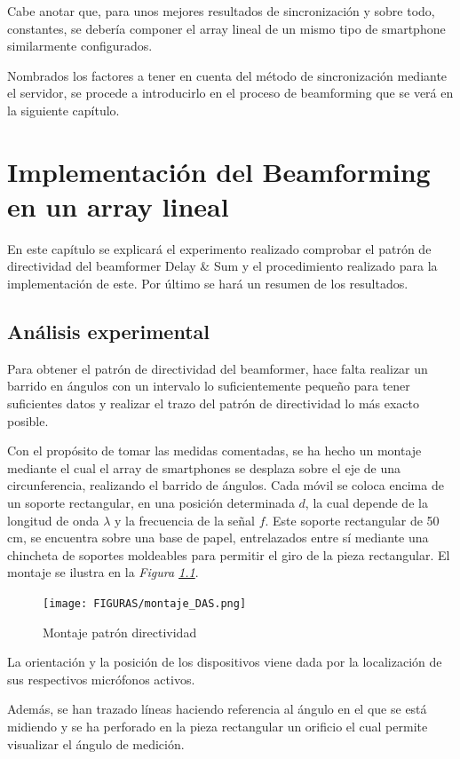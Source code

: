 \documentclass[a4paper,11pt]{book}
\begin{document}
Cabe anotar que, para unos mejores resultados de sincronización y sobre todo, constantes, se debería componer el array lineal de un mismo tipo de smartphone similarmente configurados.

Nombrados los factores a tener en cuenta del método de sincronización mediante el servidor, se procede a introducirlo en el proceso de beamforming que se verá en la siguiente capítulo.

\chapter{Implementación del Beamforming en un array lineal}
 En este capítulo se explicará el experimento realizado comprobar el patrón de directividad del beamformer Delay \& Sum y el procedimiento realizado para la implementación de este. Por último se hará un resumen de los resultados.
 
\section{Análisis experimental}
Para obtener el patrón de directividad del beamformer, hace falta realizar un barrido en ángulos con un intervalo lo suficientemente pequeño para tener suficientes datos y realizar el trazo del patrón de directividad lo más exacto posible.

Con el propósito de tomar las medidas comentadas, se ha hecho un montaje mediante el cual el array de smartphones se desplaza sobre el eje de una circunferencia, realizando el barrido de ángulos. Cada móvil se coloca encima de un soporte rectangular, en una posición determinada $d$, la cual depende de la longitud de onda $\lambda$ y la frecuencia de la señal $f$. Este soporte rectangular de 50 cm, se encuentra sobre una base de papel, entrelazados entre sí mediante una chincheta de soportes moldeables para permitir el giro de la pieza rectangular. El montaje se ilustra en la \textit{Figura \ref{montaje_DAS}}.

\begin{figure}[hbtp]
\centering
\texttt{[image: FIGURAS/montaje\_DAS.png]}
\caption{Montaje patrón directividad}
\label{montaje_DAS}
\end{figure}

La orientación y la posición de los dispositivos viene dada por la localización de sus respectivos micrófonos activos. 

Además, se han trazado líneas haciendo referencia al ángulo en el que se está midiendo y se ha perforado en la pieza rectangular un orificio el cual permite visualizar el ángulo de medición.
\end{document}
